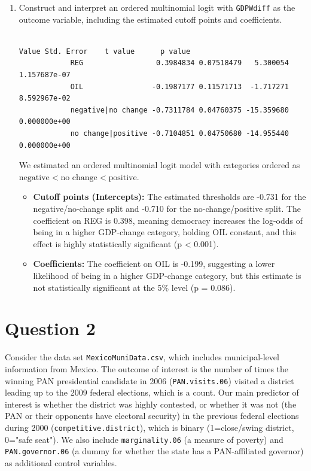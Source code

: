 \documentclass[12pt,letterpaper]{article}
\begin{document}
\begin{enumerate}
		\vspace{0.2cm}
		
		\item Construct and interpret an ordered multinomial logit with \texttt{GDPWdiff} as the outcome variable, including the estimated cutoff points and coefficients.
		
		
		
		\begin{verbatim}
																											Value Std. Error    t value      p value
			REG                 0.3984834 0.07518479   5.300054 1.157687e-07
			OIL                -0.1987177 0.11571713  -1.717271 8.592967e-02
			negative|no change -0.7311784 0.04760375 -15.359680 0.000000e+00
			no change|positive -0.7104851 0.04750680 -14.955440 0.000000e+00
		\end{verbatim}
		
		We estimated an ordered multinomial logit model with categories ordered as $\text{negative} < \text{no change} < \text{positive}$.
		\begin{itemize}
			\item \textbf{Cutoff points (Intercepts):} The estimated thresholds are -0.731 for the negative/no-change split and -0.710 for the no-change/positive split. The coefficient on REG is 0.398, meaning democracy increases the log-odds of being in a higher GDP-change category, holding OIL constant, and this effect is highly statistically significant (p < 0.001).
			\item \textbf{Coefficients:} The coefficient on OIL is -0.199, suggesting a lower likelihood of being in a higher GDP-change category, but this estimate is not statistically significant at the 5\% level (p = 0.086).
		\end{itemize}
		
	\end{enumerate}
	
	\section*{Question 2} 
	\vspace{.25cm}
	
	\noindent Consider the data set \texttt{MexicoMuniData.csv}, which includes municipal-level information from Mexico. The outcome of interest is the number of times the winning PAN presidential candidate in 2006 (\texttt{PAN.visits.06}) visited a district leading up to the 2009 federal elections, which is a count. Our main predictor of interest is whether the district was highly contested, or whether it was not (the PAN or their opponents have electoral security) in the previous federal elections during 2000 (\texttt{competitive.district}), which is binary (1=close/swing district, 0="safe seat"). We also include \texttt{marginality.06} (a measure of poverty) and \texttt{PAN.governor.06} (a dummy for whether the state has a PAN-affiliated governor) as additional control variables. 
	
\end{document}

